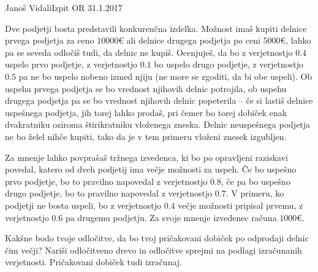 \begin{naloga}{Janoš Vidali}{Izpit OR 31.1.2017}
\begin{vprasanje}[konkurenca]
Dve podjetji bosta predstavili konkurenčna izdelka.
Možnost imaš kupiti delnice prvega podjetja za ceno $10000 €$
ali delnice drugega podjetja po ceni $5000 €$,
lahko pa se seveda odločiš tudi, da delnic ne kupiš.
Ocenjuješ, da bo z verjetnostjo $0.4$ uspelo prvo podjetje,
z verjetnostjo $0.1$ bo uspelo drugo podjetje,
z verjetnostjo $0.5$ pa ne bo uspelo nobeno izmed njiju
(ne more se zgoditi, da bi obe uspeli).
Ob uspehu prvega podjetja se bo vrednost njihovih delnic potrojila,
ob uspehu drugega podjetja pa se bo vrednost njihovih delnic popeterila
-- če si lastiš delnice uspešnega podjetja, jih torej lahko prodaš,
pri čemer bo torej dobiček enak
dvakratniku oziroma štirikratniku vloženega zneska.
Delnic neuspešnega podjetja ne bo želel nihče kupiti,
tako da je v tem primeru vloženi znesek izgubljen.

Za mnenje lahko povprašaš tržnega izvedenca,
ki bo po opravljeni raziskavi povedal,
katero od dveh podjetij ima večje možnosti za uspeh.
Če bo uspešno prvo podjetje, bo to pravilno napovedal z verjetnostjo $0.8$,
če pa bo uspešno drugo podjetje,
bo to pravilno napovedal z verjetnostjo $0.7$.
V primeru, ko podjetji ne bosta uspeli,
bo z verjetnostjo $0.4$ večje možnosti pripisal prvemu,
z verjetnostjo $0.6$ pa drugemu podjetju.
Za svoje mnenje izvedenec računa $1000 €$.

Kakšne bodo tvoje odločitve,
da bo tvoj pričakovani dobiček po odprodaji delnic čim večji?
Nariši od\-lo\-čit\-ve\-no drevo
in odločitve sprejmi na podlagi izračunanih verjetnosti.
Pričakovani dobiček tudi izračunaj.
\end{vprasanje}
\begin{odgovor}
\end{odgovor}
\end{naloga}


